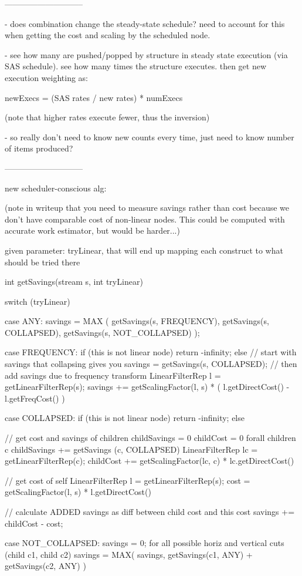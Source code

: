 -----------------------------

- does combination change the steady-state schedule?  need to account
  for this when getting the cost and scaling by the scheduled node.

- see how many are pushed/popped by structure in steady state
  execution (via SAS schedule).  see how many times the structure
  executes. then get new execution weighting as:

	newExecs = (SAS rates / new rates) * numExecs

  (note that higher rates execute fewer, thus the inversion)

- so really don't need to know new counts every time, just need to
  know number of items produced?

-----------------------------

new scheduler-conscious alg:

(note in writeup that you need to measure savings rather than cost
because we don't have comparable cost of non-linear nodes.  This could
be computed with accurate work estimator, but would be harder...)

given parameter: tryLinear, that will end up mapping each construct to
what should be tried there

int getSavings(stream s, int tryLinear) {
  switch (tryLinear) {
    case ANY:  savings = MAX ( getSavings(s, FREQUENCY),
                               getSavings(s, COLLAPSED),
                               getSavings(s, NOT_COLLAPSED) );

    case FREQUENCY:  if (this is not linear node) {
                       return -infinity;
                     } else {
                       // start with savings that collapsing gives you
	               savings = getSavings(s, COLLAPSED);
                       // then add savings due to frequency transform
                       LinearFilterRep l = getLinearFilterRep(s);
		       savings += getScalingFactor(l, s) * ( l.getDirectCost() - l.getFreqCost() )
                     }

    case COLLAPSED:
      if (this is not linear node) {
        return -infinity;
      } else {
        // get cost and savings of children
        childSavings = 0
        childCost = 0
        forall children c {
          childSavings += getSavings (c, COLLAPSED)
	  LinearFilterRep lc = getLinearFilterRep(c);
          childCost += getScalingFactor(lc, c) * lc.getDirectCost()
        }

        // get cost of self
        LinearFilterRep l = getLinearFilterRep(s);
        cost = getScalingFactor(l, s) * l.getDirectCost()

	// calculate ADDED savings as diff between child cost and this cost
        savings += childCost - cost;
      }

    case NOT_COLLAPSED:
      savings = 0;
      for all possible horiz and vertical cuts (child c1, child c2) {
        savings = MAX( savings, 
                       getSavings(c1, ANY) + getSavings(c2, ANY) )
      }
    }
  }

